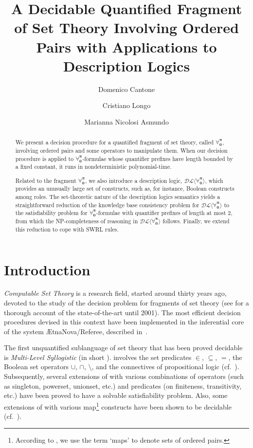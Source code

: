 \documentclass[a4paper,UKenglish]{lipics}
\title{A Decidable Quantified Fragment of Set Theory Involving Ordered
Pairs with Applications to Description Logics}
\author{Domenico Cantone}
\author{Cristiano Longo}
\author{Marianna Nicolosi Asmundo}
\affil{Dipartimento di Matematica e Informatica, Universit\`a di Catania\\
  Viale Andrea Doria 6, 95125, Catania,  Italy\\
  \texttt{\{cantone|longo|nicolosi\}@dmi.unict.it}}
\newcommand{\Lang}{\ensuremath{\mathbf{\forall_{0}^{\pi}}}\xspace}
\newcommand{\dlLang}{\ensuremath{\mathcal{DL\langle}\Lang\mathcal{\rangle}}\xspace}
\begin{document}
\maketitle

\begin{abstract}
We present a decision procedure for a quantified fragment of
set theory, called \Lang, involving ordered pairs and some operators to manipulate them.
When our decision procedure is applied to \Lang-formulae whose quantifier prefixes
have length bounded by a fixed constant, it runs in nondeterministic
polynomial-time.

Related to the fragment \Lang, we also introduce a description logic,
\dlLang, which provides an unusually large set of constructs, such as,
for instance, Boolean constructs among roles.  The set-theoretic
nature of the description logics semantics yields a straightforward
reduction of the knowledge base consistency problem for \dlLang to the
satisfiability problem for \Lang-formulae with quantifier prefixes of
length at most 2, from which the \textsc{NP}-completeness of reasoning
in \dlLang follows.  Finally, we extend this reduction to cope with
\textsf{SWRL} rules.
\end{abstract}

\section{Introduction}\label{INTRO}


\emph{Computable Set Theory} is a research field, started around
thirty years ago, devoted to the study of the decision problem for
fragments of set theory (see \cite{CanFerOmo89a,CanOmoPol01} for a
thorough account of the state-of-the-art until 2001).  The most
efficient decision procedures devised in this context have been
implemented in the inferential core of the system
\textsf{{\AE}tnaNova/Referee}, described
in~\cite{CanOmoSchUrs03,OmoCanPolSch06,SchwCanOmoPol11}.


The first unquantified sublanguage of set theory that has been proved
decidable is \emph{Multi-Level Syllogistic} (in short \mls).  \mls
involves the set predicates $\in$, $\subseteq$, $=$, the Boolean set
operators $\cup$, $\cap$, $\setminus$, and the connectives of
propositional logic (cf.\ \cite{FerOmoSch1980}).  Subsequently,
several extensions of \mls with various combinations of operators
(such as singleton, powerset, unionset, etc.)  and predicates (on
finiteness, transitivity, etc.)  have been proved to have a solvable
satisfiability problem. Also, some extensions of \mls with various
map\footnote{According to \cite{SchDewSchDub1986}, we use the term
`maps' to denote sets of ordered pairs.}
constructs have been shown to be decidable (cf.\
\cite{CanSch91,CanLonNic2010}).
\end{document}
